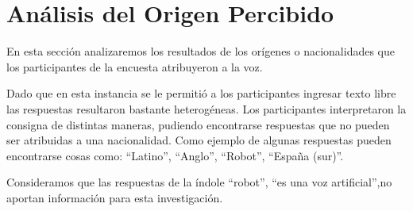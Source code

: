




\clearpage
\section{Análisis del Origen Percibido}

En esta sección analizaremos los resultados de los orígenes o nacionalidades que los participantes de la encuesta atribuyeron a la voz.

Dado que en esta instancia se le permitió a los participantes ingresar texto libre las respuestas resultaron bastante heterogéneas. Los participantes interpretaron la consigna de distintas maneras, pudiendo encontrarse respuestas que no pueden ser atribuidas a una nacionalidad. Como ejemplo de algunas respuestas pueden encontrarse cosas como: ``Latino'', ``Anglo'', ``Robot'', ``España (sur)''.

Consideramos que las respuestas de la índole ``robot'', ``es una voz artificial'',no aportan información para esta investigación.

